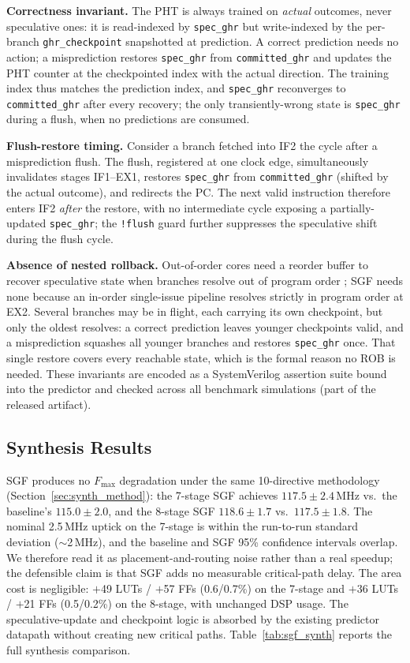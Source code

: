 \documentclass[acmsmall,nonacm,screen]{acmart}
\begin{document}
\textbf{Correctness invariant.}
The PHT is always trained on \emph{actual} outcomes, never speculative ones: it is read-indexed by \texttt{spec\_ghr} but write-indexed by the per-branch \texttt{ghr\_checkpoint} snapshotted at prediction. A correct prediction needs no action; a misprediction restores \texttt{spec\_ghr} from \texttt{committed\_ghr} and updates the PHT counter at the checkpointed index with the actual direction. The training index thus matches the prediction index, and \texttt{spec\_ghr} reconverges to \texttt{committed\_ghr} after every recovery; the only transiently-wrong state is \texttt{spec\_ghr} during a flush, when no predictions are consumed.

\textbf{Flush-restore timing.}
Consider a branch fetched into IF2 the cycle after a misprediction flush. The flush, registered at one clock edge, simultaneously invalidates stages IF1--EX1, restores \texttt{spec\_ghr} from \texttt{committed\_ghr} (shifted by the actual outcome), and redirects the PC. The next valid instruction therefore enters IF2 \emph{after} the restore, with no intermediate cycle exposing a partially-updated \texttt{spec\_ghr}; the \texttt{!flush} guard further suppresses the speculative shift during the flush cycle.

\textbf{Absence of nested rollback.}
Out-of-order cores need a reorder buffer to recover speculative state when branches resolve out of program order \cite{kessler1999alpha, yeager1996mips}; SGF needs none because an in-order single-issue pipeline resolves strictly in program order at EX2. Several branches may be in flight, each carrying its own checkpoint, but only the oldest resolves: a correct prediction leaves younger checkpoints valid, and a misprediction squashes all younger branches and restores \texttt{spec\_ghr} once. That single restore covers every reachable state, which is the formal reason no ROB is needed. These invariants are encoded as a SystemVerilog assertion suite bound into the predictor and checked across all benchmark simulations (part of the released artifact).

\subsection{Synthesis Results}
\label{sec:sgf_synth}

SGF produces no $F_{\max}$ degradation under the same 10-directive methodology (Section~\ref{sec:synth_method}): the 7-stage SGF achieves $117.5 \pm 2.4$\,MHz vs.\ the baseline's $115.0 \pm 2.0$, and the 8-stage SGF $118.6 \pm 1.7$ vs.\ $117.5 \pm 1.8$.
The nominal 2.5\,MHz uptick on the 7-stage is within the run-to-run standard deviation ($\sim$2\,MHz), and the baseline and SGF 95\% confidence intervals overlap. We therefore read it as placement-and-routing noise rather than a real speedup; the defensible claim is that SGF adds no measurable critical-path delay.
The area cost is negligible: $+$49 LUTs / $+$57 FFs (0.6/0.7\%) on the 7-stage and $+$36 LUTs / $+$21 FFs (0.5/0.2\%) on the 8-stage, with unchanged DSP usage. The speculative-update and checkpoint logic is absorbed by the existing predictor datapath without creating new critical paths. Table~\ref{tab:sgf_synth} reports the full synthesis comparison.
\end{document}
